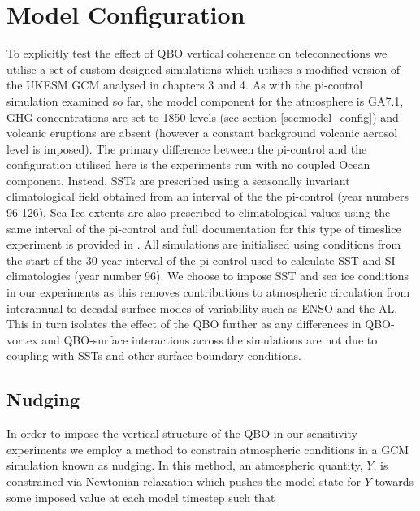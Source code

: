 \section{Model Configuration}

To explicitly test the effect of QBO vertical coherence on teleconnections we utilise a set of custom designed simulations which utilises a modified version of the UKESM GCM analysed in chapters 3 and 4. As with the pi-control simulation examined so far, the model component for the atmosphere is GA7.1, GHG concentrations are set to 1850 levels (see section \ref{sec:model_config}) and volcanic eruptions are absent (however a constant background volcanic aerosol level is imposed). The primary difference between the pi-control and the configuration utilised here is the experiments run with no coupled Ocean component. Instead, SSTs are prescribed using a seasonally invariant climatological field obtained from an interval of the the pi-control (year numbers 96-126). Sea Ice extents are also prescribed to climatological values using the same interval of the pi-control and full documentation for this type of timeslice experiment is provided in \cite{oconnorAssessment2021}. All simulations are initialised using conditions from the start of the 30 year interval of the pi-control used to calculate SST and SI climatologies (year number 96). We choose to impose SST and sea ice conditions in our experiments as this removes contributions to atmospheric circulation from interannual to decadal surface modes of variability such as ENSO and the AL. This in turn isolates the effect of the QBO further as any differences in QBO-vortex and QBO-surface interactions across the simulations are not due to coupling with SSTs and other surface boundary conditions.  %

\subsection{Nudging}
In order to impose the vertical structure of the QBO in our sensitivity experiments we employ a method to constrain atmospheric conditions in a GCM simulation known as nudging. In this method, an atmospheric quantity, $Y$, is constrained via Newtonian-relaxation which pushes the model state for $Y$ towards some imposed value at each model timestep such that

